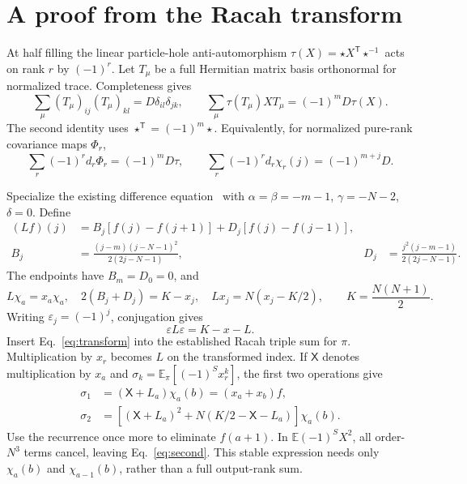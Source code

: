 \documentclass[11pt,a4paper]{article}
\newcommand{\EE}{\mathbb E}
\begin{document}
\newpage
\section{A proof from the Racah transform}
At half filling the linear particle-hole anti-automorphism
$\tau(X)=\star X^{\mathsf T}\star^{-1}$ acts on rank $r$ by $(-1)^r$.
Let $T_\mu$ be a full Hermitian matrix basis orthonormal for normalized
trace. Completeness gives
\begin{equation}
 \sum_\mu(T_\mu)_{ij}(T_\mu)_{kl}=D\delta_{il}\delta_{jk},\qquad
 \sum_\mu\tau(T_\mu)XT_\mu=(-1)^mD\tau(X).
\end{equation}
The second identity uses $\star^{\mathsf T}=(-1)^m\star$.
Equivalently, for normalized pure-rank covariance maps $\Phi_r$,
\begin{equation}
 \sum_r(-1)^r d_r\Phi_r=(-1)^mD\tau,
 \qquad
 \sum_r(-1)^r d_r\chi_r(j)=(-1)^{m+j}D.
 \label{eq:transform}
\end{equation}

Specialize the existing difference equation~\cite[Eq.~(1.2.5)]{KS}
with $\alpha=\beta=-m-1$, $\gamma=-N-2$, $\delta=0$.
Define
\begin{align}
 (Lf)(j)&=B_j[f(j)-f(j+1)]+D_j[f(j)-f(j-1)],\\
 B_j&=\frac{(j-m)(j-N-1)^2}{2(2j-N-1)},&
 D_j&=\frac{j^2(j-m-1)}{2(2j-N-1)}.
\end{align}
The endpoints have $B_m=D_0=0$, and
\begin{equation}
 L\chi_a=x_a\chi_a,\quad
 2(B_j+D_j)=K-x_j,\quad Lx_j=N(x_j-K/2),
 \qquad K=\frac{N(N+1)}2.
\end{equation}
Writing $\varepsilon_j=(-1)^j$, conjugation gives
\begin{equation}
 \varepsilon L\varepsilon=K-x-L.
\end{equation}
Insert Eq.~\eqref{eq:transform} into the established Racah triple sum
for $\pi$. Multiplication by $x_r$ becomes $L$ on the transformed
index. If $\mathsf X$ denotes multiplication by $x_a$ and
$\sigma_k=\EE_\pi[(-1)^Sx_r^k]$, the first two operations give
\begin{align}
 \sigma_1&=(\mathsf X+L_a)\chi_a(b)=(x_a+x_b)f,\\
 \sigma_2&=\left[(\mathsf X+L_a)^2
             +N(K/2-\mathsf X-L_a)\right]\chi_a(b).
\end{align}
Use the recurrence once more to eliminate $f(a+1)$.
In $\EE(-1)^SX^2$, all order-$N^3$ terms cancel, leaving
Eq.~\eqref{eq:second}. This stable expression needs only
$\chi_a(b)$ and $\chi_{a-1}(b)$, rather than a full output-rank sum.
\end{document}
